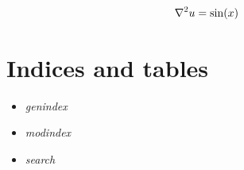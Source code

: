 \documentclass[letterpaper,10pt,english]{sphinxmanual}
\begin{document}
\begin{gather}
\begin{split}\nabla^2 u = \sin(x)\end{split}\notag
\end{gather}

\chapter{Indices and tables}
\label{index:indices-and-tables}\begin{itemize}
\item {} 
\emph{genindex}

\item {} 
\emph{modindex}

\item {} 
\emph{search}

\end{itemize}



\renewcommand{\indexname}{Index}
\printindex
\end{document}
